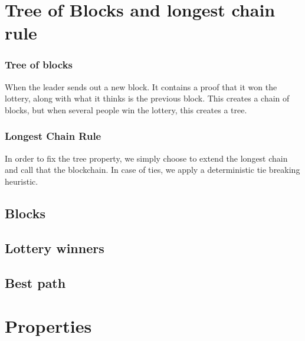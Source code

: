 \section{Tree of Blocks and longest chain rule}
        \begin{frame}
            \frametitle{Tree of blocks}
                When the leader sends out a new block. It contains a proof that it won the lottery, along with what it thinks is the previous block. This creates a chain of blocks, but when several people win the lottery, this creates a tree.         
        \end{frame}
        \begin{frame}
            \frametitle{Longest Chain Rule}
                In order to fix the tree property, we simply choose to extend the longest chain and call that the blockchain. In case of ties, we apply a deterministic tie breaking heuristic. 

        \end{frame}
    \subsection{Blocks}
    \subsection{Lottery winners}
    \subsection{Best path}

\section{Properties}



